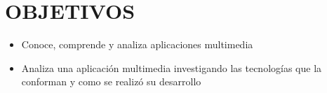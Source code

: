 \section{OBJETIVOS}
\begin{itemize}
    \item Conoce, comprende y analiza aplicaciones multimedia
    \item Analiza una aplicación multimedia investigando las tecnologías que la conforman y como se realizó su desarrollo
\end{itemize}